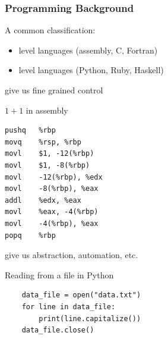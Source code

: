 \begin{frame}
    \frametitle{Programming Background}
    
    A common classification:
    \begin{itemize}
        \item {} level languages (assembly, C, Fortran)
            \vspace{0.5em}
        \item {} level languages (Python, Ruby, Haskell)
    \end{itemize}

    \vspace{0.5em}
    \vspace{0.5em}
    \vspace{0.5em}
    \vspace{0.5em}
    \vspace{0.5em}
     give us fine grained control 


\end{frame}





\begin{frame}[fragile]
    
    \Eg $1 + 1$ in assembly

    {\small
    \begin{verbatim}
pushq   %rbp
movq    %rsp, %rbp
movl    $1, -12(%rbp)
movl    $1, -8(%rbp)
movl    -12(%rbp), %edx
movl    -8(%rbp), %eax
addl    %edx, %eax
movl    %eax, -4(%rbp)
movl    -4(%rbp), %eax
popq    %rbp
    \end{verbatim}
    }



\end{frame}


\begin{frame}
    
     give us abstraction, automation, etc.

\end{frame}



\begin{frame}[fragile]

    \Eg Reading from a file in Python
    
    \begin{verbatim}
    data_file = open("data.txt")
    for line in data_file:
        print(line.capitalize()) 
    data_file.close()
    \end{verbatim}

\end{frame}






